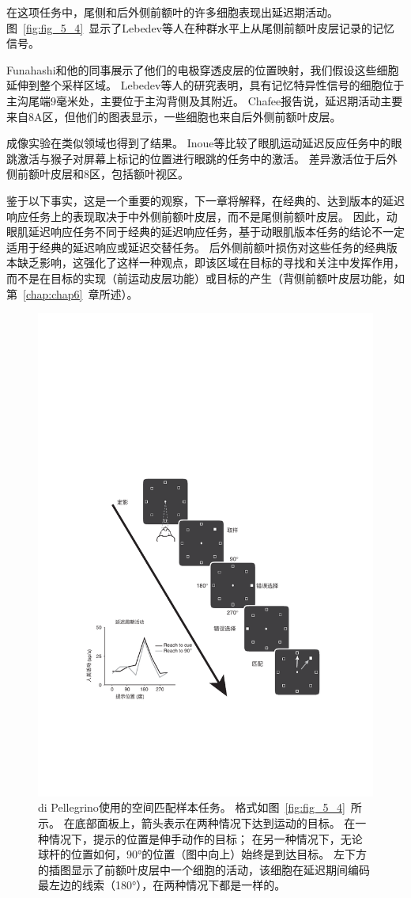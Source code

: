 在这项任务中，尾侧和后外侧前额叶的许多细胞表现出延迟期活动\cite{chafee1998matching}。
图~\ref{fig:fig_5_4}~显示了Lebedev等人\cite{lebedev2004representation}在种群水平上从尾侧前额叶皮层记录的记忆信号。


Funahashi和他的同事\cite{funahashi1989mnemonic,takeda2002prefrontal}展示了他们的电极穿透皮层的位置映射，我们假设这些细胞延伸到整个采样区域。
Lebedev等人的研究表明，具有记忆特异性信号的细胞位于主沟尾端9毫米处，主要位于主沟背侧及其附近。
Chafee\cite{chafee1998matching}报告说，延迟期活动主要来自8A区，但他们的图表显示，一些细胞也来自后外侧前额叶皮层。


成像实验在类似领域也得到了结果。
Inoue等\cite{inoue2004functional}比较了眼肌运动延迟反应任务中的眼跳激活与猴子对屏幕上标记的位置进行眼跳的任务中的激活。
差异激活位于后外侧前额叶皮层和8区，包括额叶视区。


鉴于以下事实，这是一个重要的观察，下一章将解释，在经典的、达到版本的延迟响应任务上的表现取决于中外侧前额叶皮层，而不是尾侧前额叶皮层。
因此，动眼肌延迟响应任务不同于经典的延迟响应任务，基于动眼肌版本任务的结论不一定适用于经典的延迟响应或延迟交替任务。
后外侧前额叶损伤对这些任务的经典版本缺乏影响\cite{butters1969retention}，这强化了这样一种观点，即该区域在目标的寻找和关注中发挥作用，而不是在目标的实现（前运动皮层功能）或目标的产生（背侧前额叶皮层功能，如第~\ref{chap:chap6}~章所述）。


\begin{figure}
	\centering
	\includegraphics[width=0.75\linewidth]{chap5/Fig_5_5}
	\caption{di Pellegrino\cite{di1993visuospatial}使用的空间匹配样本任务。
		格式如图~\ref{fig:fig_5_4}~所示。
		在底部面板上，箭头表示在两种情况下达到运动的目标。
		在一种情况下，提示的位置是伸手动作的目标；
		在另一种情况下，无论球杆的位置如何，90°的位置（图中向上）始终是到达目标。
		左下方的插图显示了前额叶皮层中一个细胞的活动，该细胞在延迟期间编码最左边的线索（180°），在两种情况下都是一样的。}
	\label{fig:fig_5_5}
\end{figure}



